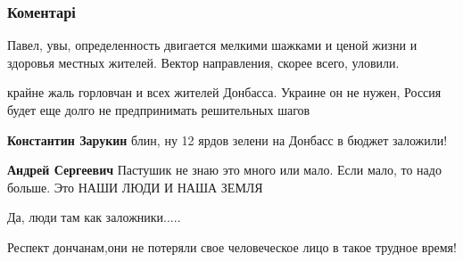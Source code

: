  
 
 
 
 
\subsubsection{Коментарі}

\begin{itemize} %
Павел, увы, определенность двигается мелкими шажками и ценой жизни и здоровья местных жителей. Вектор направления, скорее всего, уловили.

крайне жаль горловчан и всех жителей Донбасса. Украине он не нужен, Россия будет еще долго не предпринимать решительных шагов

\begin{itemize} %
\textbf{Константин Зарукин} блин, ну 12 ярдов зелени на Донбасс в бюджет заложили!

\textbf{Андрей Сергеевич} Пастушик не знаю это много или мало. Если мало, то надо больше. Это НАШИ ЛЮДИ И НАША ЗЕМЛЯ
\end{itemize} %

Да, люди там как заложники.....

Респект дончанам,они не потеряли свое человеческое лицо в такое трудное время!
\end{itemize} %
